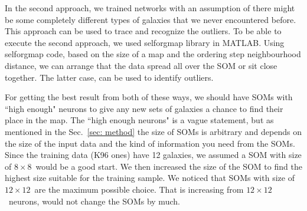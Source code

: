    In the second approach, we trained networks with an assumption of there might be some completely different types of galaxies that we never encountered before.
    This approach can be used to trace and recognize the outliers.
    To be able to execute the second approach, we used {\tiny selforgmap} library in {\tiny MATLAB}.
    Using {\tiny selforgmap} code, based on the size of a map and the ordering step neighbourhood distance, we can arrange that the data spread all over the SOM or sit close together.
    The latter case, can be used to identify outliers. 

    For getting the best result from both of these ways, we should have SOMs with ``high enough"  neurons to give any new sets of galaxies a chance to find their place in the map.
    The  ``high enough  neurons" is a vague statement, but as mentioned in the Sec.~\ref{sec: method} the size of SOMs is arbitrary and depends on the size of the input data and the kind of information you need from the SOMs. %
    Since the training data (K96 ones) have 12 galaxies, we assumed a SOM with size of $8\times8$~would be a good start.
    We then increased the size of the SOM to find the highest size suitable for the training sample.
    We noticed that SOMs with size of $12\times12$~are the maximum possible choice.
    That is increasing from $12\times12$~neurons, would not change the SOMs by much.
    
